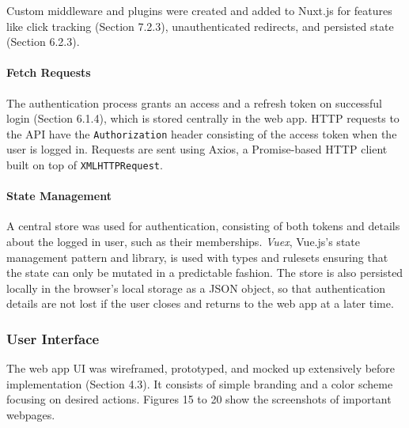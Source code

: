 \documentclass{article}
\begin{document}
Custom middleware and plugins were created and added to Nuxt.js for features like click tracking (Section 7.2.3), unauthenticated redirects, and persisted state (Section 6.2.3).

\paragraph{Fetch Requests}

The authentication process grants an access and a refresh token on successful login (Section 6.1.4), which is stored centrally in the web app. HTTP requests to the API have the \texttt{Authorization} header consisting of the access token when the user is logged in. Requests are sent using Axios, a Promise-based HTTP client built on top of  \texttt{XMLHTTPRequest}.

\paragraph{State Management}

A central store was used for authentication, consisting of both tokens and details about the logged in user, such as their memberships. \emph{Vuex}, Vue.js's state management pattern and library, is used with types and rulesets ensuring that the state can only be mutated in a predictable fashion. The store is also persisted locally in the browser's local storage as a JSON object, so that authentication details are not lost if the user closes and returns to the web app at a later time.

\subsubsection{User Interface}

The web app UI was wireframed, prototyped, and mocked up extensively before implementation (Section 4.3). It consists of simple branding and a color scheme focusing on desired actions. Figures 15 to 20 show the screenshots of important webpages.
\end{document}
